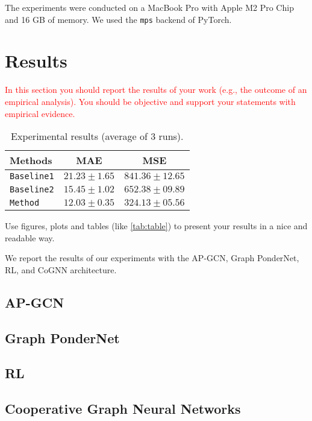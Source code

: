 \documentclass{gdl}
\begin{document}
The experiments were conducted on a MacBook Pro with Apple M2 Pro Chip and 16 GB of memory. We used the \texttt{mps} backend of PyTorch.


\section{Results}

\textcolor{red}{In this section you should report the results of your work (e.g., the outcome of an empirical analysis). You should be objective and support your statements with empirical evidence.}

\begin{table}[h]
\small\sf\centering
\caption{Experimental results (average of 3 runs).}
\begin{tabular}{l c c}
\toprule
Methods & MAE & MSE\\
\midrule
\texttt{Baseline1} & $21.23 \pm 1.65$ & $841.36 \pm 12.65$\\
\texttt{Baseline2} & $15.45 \pm 1.02$ & $652.38 \pm 09.89$\\
\midrule
\texttt{Method} & $12.03 \pm 0.35$ & $324.13 \pm 05.56$\\
\bottomrule
\end{tabular}
\label{tab:table}
\end{table}

Use figures, plots and tables (like \autoref{tab:table}) to present your results in a nice and readable way.

We report the results of our experiments with the AP-GCN, Graph PonderNet, RL, and CoGNN architecture.

\subsection{AP-GCN}

\subsection{Graph PonderNet}

\subsection{RL}

\subsection{Cooperative Graph Neural Networks}
\end{document}
